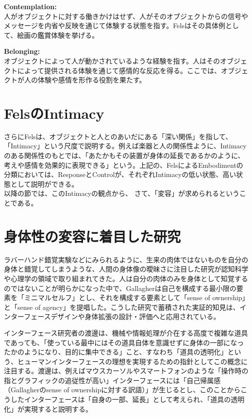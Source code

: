 \textbf{Contemplation:}\\
人がオブジェクトに対する働きかけはせず、人がそのオブジェクトからの信号やメッセージを内省や反映を通じて体験する状態を指す。Felsはその具体例として、絵画の鑑賞体験を挙げる。

\textbf{Belonging:}\\
オブジェクトによって人が動かされているような経験を指す。人はそのオブジェクトによって提供される体験を通じて感情的な反応を得る。ここでは、オブジェクトが人の体験や感情を形作る役割を果たす。

\section{FelsのIntimacy}
さらにFelsは、オブジェクトと人とのあいだにある「深い関係」を指して、「Intimacy」という尺度で説明する。例えば楽器と人の関係性ように、Intimacyのある関係性のもとでは、「あたかもその装置が身体の延長であるかのように、考えや感情を効果的に表現できる」という。上記の、FelsによるEmbodimentの分類においては、ResponseとControlが、それぞれIntimacyの低い状態、高い状態として説明ができる。\\
以降の節では、このIntimacyの観点から、
さて、「変容」が求められるということである。

\section{身体性の変容に着目した研究}
ラバーハンド錯覚実験などにみられるように、生来の肉体ではないものを自分の身体と錯覚してしまうような、人間の身体像の曖昧さに注目した研究が認知科学や心理学の領域で取り組まれてきた。人は自分の肉体のみを身体として知覚するのではないことが明らかになった中で、Gallagher\cite{Gallagher2000}は自己を構成する最小限の要素を「ミニマルセルフ」とし、それを構成する要素として「sense of ownership」と「sense of agency」を提唱した。こうした研究で蓄積された実証的知見は、インターフェースデザインや身体拡張の設計・評価へと応用されている。

インターフェース研究者の渡邊は、機械や情報処理が介在する高度で複雑な道具であっても、「使っている最中にはその道具自体を意識せずに身体の一部になったかのようになり、目的に集中できる」こと、すなわち「道具の透明化」という、ヒューマンインターフェースの理想を実現するための指針としてこの概念に注目する。渡邊は、例えばマウスカーソルやスマートフォンのような「操作時の指とグラフィックの追従性が高い」インターフェースには「自己帰属感（Gallagherのsense of ownershipに対する訳語）」が生じるとし、このことからこうしたインターフェースは「自身の一部、延長」として考えられ、「道具の透明化」が実現すると説明する\cite{Watanabe2013}。

